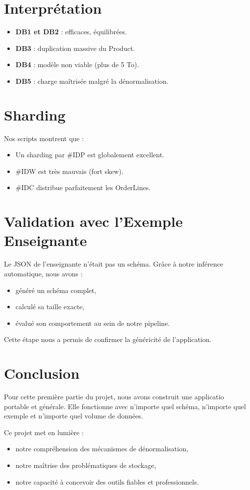 \documentclass[12pt,a4paper]{article}
\begin{document}
\section{Interprétation}

\begin{itemize}
    \item \textbf{DB1 et DB2} : efficaces, équilibrées.
    \item \textbf{DB3} : duplication massive du Product.
    \item \textbf{DB4} : modèle non viable (plus de 5 To).
    \item \textbf{DB5} : charge maîtrisée malgré la dénormalisation.
\end{itemize}

\section{Sharding}

Nos scripts montrent que :

\begin{itemize}
    \item Un sharding par \#IDP est globalement excellent.
    \item \#IDW est très mauvais (fort skew).
    \item \#IDC distribue parfaitement les OrderLines.
\end{itemize}

\section{Validation avec l'Exemple Enseignante}

Le JSON de l’enseignante n’était pas un schéma.  
Grâce à notre inférence automatique, nous avons :

\begin{itemize}
    \item généré un schéma complet,
    \item calculé sa taille exacte,
    \item évalué son comportement au sein de notre pipeline.
\end{itemize}

Cette étape nous a permis de confirmer la généricité de l’application.

\section{Conclusion}
Pour cette première partie du projet, nous avons construit une applicatio portable et générale.  
Elle fonctionne avec n’importe quel schéma, n’importe quel exemple et n’importe quel volume de données.

Ce projet met en lumière :
\begin{itemize}
    \item notre compréhension des mécanismes de dénormalisation,
    \item notre maîtrise des problématiques de stockage,
    \item notre capacité à concevoir des outils fiables et professionnels.
\end{itemize}
\end{document}
